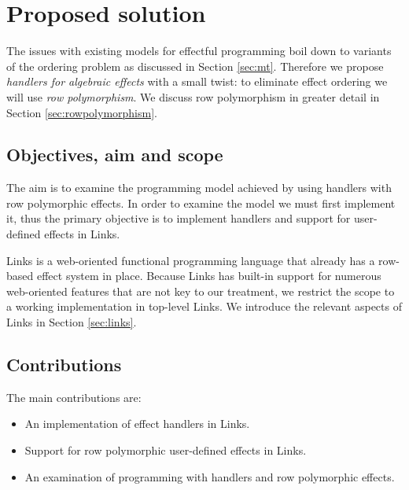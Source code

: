 \section{Proposed solution}\label{sec:proposedsolution}
The issues with existing models for effectful programming boil down to variants of the ordering problem as discussed in Section \ref{sec:mt}. Therefore we propose \emph{handlers for algebraic effects} with a small twist: to eliminate effect ordering we will use \emph{row polymorphism}. We discuss row polymorphism in greater detail in Section \ref{sec:rowpolymorphism}.

\subsection{Objectives, aim and scope}
The aim is to examine the programming model achieved by using handlers with row polymorphic effects.
In order to examine the model we must first implement it, thus the primary objective is to implement handlers and support for user-defined effects in Links.

Links is a web-oriented functional programming language that already has a row-based effect system in place. Because Links has built-in support for numerous web-oriented features that are not key to our treatment, we restrict the scope to a working implementation in top-level Links. We introduce the relevant aspects of Links in Section \ref{sec:links}.

\subsection{Contributions}
The main contributions are:
\begin{itemize}
  \item An implementation of effect handlers in Links.
  \item Support for row polymorphic user-defined effects in Links.
  \item An examination of programming with handlers and row polymorphic effects.
\end{itemize}